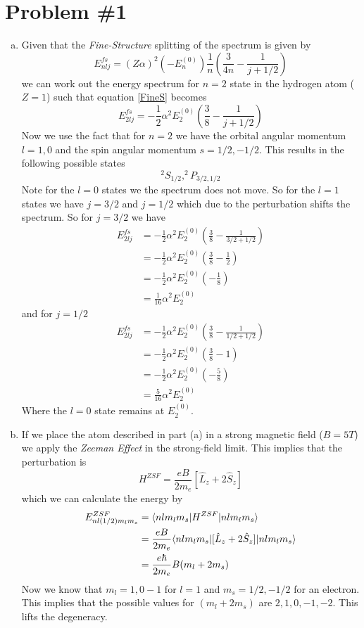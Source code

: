 \documentclass[11pt]{article}
\numberwithin{equation}{section}
\begin{document}


\section{Problem \#1}
\begin{enumerate}[(a)]
\item
Given that the \emph{Fine-Structure} splitting of the spectrum is given by
\begin{equation}
E_{nlj}^{fs} = (Z\alpha)^2(-E_n^{(0)})\frac{1}{n}\left(\frac{3}{4n} - \frac{1}{j+1/2}\right)
\label{FineS}
\end{equation}
we can work out the energy spectrum for $n=2$ state in the hydrogen atom ($Z=1$) such that equation \ref{FineS} becomes
$$E_{2lj}^{fs} = -\frac{1}{2}\alpha^2E_2^{(0)}\left(\frac{3}{8} - \frac{1}{j+1/2}\right)$$
Now we use the fact that for $n=2$ we have the orbital angular momentum $l=1,0$ and the spin angular momentum $s=1/2, -1/2$. This results in the following possible states
$$^{2}S_{1/2}, ^{2}P_{3/2,1/2}$$
Note for the $l=0$ states we the spectrum does not move. So for the $l=1$ states we have $j=3/2$ and $j=1/2$ which due to the perturbation shifts the spectrum. So for $j=3/2$ we have
\begin{align*}
E_{2lj}^{fs} &= -\frac{1}{2}\alpha^2E_2^{(0)}\left(\frac{3}{8} - \frac{1}{3/2+1/2}\right)\\
&= -\frac{1}{2}\alpha^2E_2^{(0)}\left(\frac{3}{8} - \frac{1}{2}\right)\\
&= -\frac{1}{2}\alpha^2E_2^{(0)}\left(-\frac{1}{8}\right)\\
&= \frac{1}{16}\alpha^2E_2^{(0)}
\end{align*}
and for $j=1/2$ 
\begin{align*}
E_{2lj}^{fs} &= -\frac{1}{2}\alpha^2E_2^{(0)}\left(\frac{3}{8} - \frac{1}{1/2+1/2}\right)\\
&= -\frac{1}{2}\alpha^2E_2^{(0)}\left(\frac{3}{8} - 1\right)\\
&= -\frac{1}{2}\alpha^2E_2^{(0)}\left(-\frac{5}{8}\right)\\
&= \frac{5}{16}\alpha^2E_2^{(0)}
\end{align*}
Where the $l=0$ state remains at $E_2^{(0)}$.

\item
If we place the atom described in part (a) in a strong magnetic field ($B = 5\unit{T}$) we apply the \emph{Zeeman Effect} in the strong-field limit. This implies that the perturbation is
$$H^{ZSF} = \frac{eB}{2m_e}[\hat{L}_z+2\hat{S}_z]$$
which we can calculate the energy by
\begin{align*}
E^{ZSF}_{nl(1/2)m_lm_s} &= \langle{nlm_lm_s}|H^{ZSF}|{nlm_lm_s}\rangle\\
&= \frac{eB}{2m_e}\langle{nlm_lm_s}|[\hat{L}_z+2\hat{S}_z]|{nlm_lm_s}\rangle\\
&= \frac{e\hbar}{2m_e}B(m_l+2m_s) 
\end{align*}
Now we know that $m_l = 1,0-1$ for $l=1$ and $m_s = 1/2,-1/2$ for an electron. This implies that the possible values for $(m_l+2m_s)$ are $2,1,0,-1,-2$. This lifts the degeneracy.


\end{enumerate}
\end{document}
